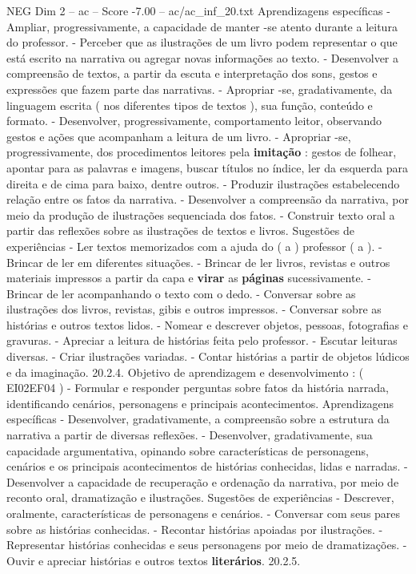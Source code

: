 \begin{textsample}{NEG Dim 2 – ac – Score -7.00 – ac/ac\_inf\_20.txt}
Aprendizagens específicas - Ampliar, progressivamente, a capacidade de manter -se atento durante a leitura do professor. - Perceber que as ilustrações de um livro podem representar o que está escrito na narrativa ou agregar novas informações ao texto. - Desenvolver a compreensão de textos, a partir da escuta e interpretação dos sons, gestos e expressões que fazem parte das narrativas. - Apropriar -se, gradativamente, da linguagem escrita ( nos diferentes tipos de textos ), sua função, conteúdo e formato. - Desenvolver, progressivamente, comportamento leitor, observando gestos e ações que acompanham a leitura de um livro. - Apropriar -se, progressivamente, dos procedimentos leitores pela \textbf{imitação} : gestos de folhear, apontar para as palavras e imagens, buscar títulos no índice, ler da esquerda para direita e de cima para baixo, dentre outros. - Produzir ilustrações estabelecendo relação entre os fatos da narrativa. - Desenvolver a compreensão da narrativa, por meio da produção de ilustrações sequenciada dos fatos. - Construir texto oral a partir das reflexões sobre as ilustrações de textos e livros.
Sugestões de experiências - Ler textos memorizados com a ajuda do ( a ) professor ( a ). - Brincar de ler em diferentes situações. - Brincar de ler livros, revistas e outros materiais impressos a partir da capa e \textbf{virar} as \textbf{páginas} sucessivamente. - Brincar de ler acompanhando o texto com o dedo. - Conversar sobre as ilustrações dos livros, revistas, gibis e outros impressos. - Conversar sobre as histórias e outros textos lidos. - Nomear e descrever objetos, pessoas, fotografias e gravuras. - Apreciar a leitura de histórias feita pelo professor. - Escutar leituras diversas. - Criar ilustrações variadas. - Contar histórias a partir de objetos lúdicos e da imaginação. 20.2.4.
Objetivo de aprendizagem e desenvolvimento : ( EI02EF04 ) - Formular e responder perguntas sobre fatos da história narrada, identificando cenários, personagens e principais acontecimentos.
Aprendizagens específicas - Desenvolver, gradativamente, a compreensão sobre a estrutura da narrativa a partir de diversas reflexões. - Desenvolver, gradativamente, sua capacidade argumentativa, opinando sobre características de personagens, cenários e os principais acontecimentos de histórias conhecidas, lidas e narradas. - Desenvolver a capacidade de recuperação e ordenação da narrativa, por meio de reconto oral, dramatização e ilustrações.
Sugestões de experiências - Descrever, oralmente, características de personagens e cenários. - Conversar com seus pares sobre as histórias conhecidas. - Recontar histórias apoiadas por ilustrações. - Representar histórias conhecidas e seus personagens por meio de dramatizações. - Ouvir e apreciar histórias e outros textos \textbf{literários}. 20.2.5.

\end{textsample}
